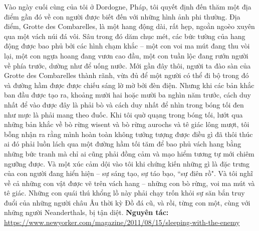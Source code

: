 \begin{multicols}{2}
	\vskip 0.1cm
	Vào ngày cuối cùng của tôi ở Dordogne, Pháp, tôi quyết định đến thăm một địa điểm gần đó về con người được biết đến với những hình ảnh phi thường. Địa điểm, Grotte des Combarelles, là một hang động dài, rất hẹp, ngoằn ngoèo xuyên qua một vách núi đá vôi. Sâu trong đó dăm chục mét, các bức tường của hang động được bao phủ bởi các hình chạm khắc -- một con voi ma mút đang thu vòi lại, một con ngựa hoang đang vươn cao đầu, một con tuần lộc đang rướn người về phía trước, dường như để uống nước. Mới gần đây thôi, người ta đào sàn của Grotte des Combarelles thành rãnh, vừa đủ để một người có thể đi bộ trong đó và đường hầm được được chiếu sáng lờ mờ bởi đèn điện. Nhưng khi các bản khắc ban đầu được tạo ra, khoảng mười hai hoặc mười ba nghìn năm trước, cách duy nhất để vào được đây là phải bò và cách duy nhất để nhìn trong bóng tối đen như mực là phải mang theo đuốc. Khi tôi quờ quạng trong bóng tối, lướt qua những bản khắc về bò rừng wisent và bò rừng aurochs và tê giác lông mượt, tôi bỗng nhận ra rằng mình hoàn toàn không tưởng tượng được điều gì đã thôi thúc ai đó phải luồn lách qua một đường hầm tối tăm để bao phủ vách hang bằng những bức tranh mà chỉ ai cũng phải đồng cảm và mạo hiểm tương tự mới chiêm ngưỡng được. Và một xúc cảm dội vào tôi khi chứng kiến những gì là đặc trưng của con người đang hiển hiện -- sự sáng tạo, sự táo bạo, ``sự điên rồ". Và tôi nghĩ về cả những con vật được vẽ trên vách hang -- những con bò rừng, voi ma mút và tê giác. Những con quái thú khổng lồ này phải chạy trốn khỏi sự săn bắn truy đuổi của những người châu Âu thời kỳ Đồ đá cũ, và rồi, từng con một, cùng với những người Neanderthals, bị tận diệt.
	\vskip 0.1cm
	\textbf{{\color{timhieukhoahoc}Nguyên tác:}} \hspace*{5pt} {\small\url{https://www.newyorker.com/magazine/2011/08/15/sleeping-with-the-enemy}}
\end{multicols}



